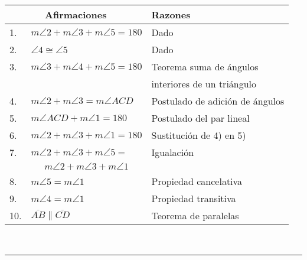 \documentclass[11pt,spanish,letter]{book}
\newenvironment{sol}[2]{\renewcommand{\arraystretch}{2.06}
\newcommand{\tn}{\tabularnewline}
\newcommand{\rr}{\raggedright}
\fontsize{7}{6}\selectfont
\vskip 5pt  {
 \colorbox{red!30}{\color{white}{Soluci\'on:}}
 }\vskip 5pt
\begin{center}
 \begin{tabular}
[t]{ll||l}\hline
\multicolumn{2}{c||}{Afirmaciones} & Razones\\\hline\hline
1. & #1 & \multicolumn{1}{|l}{Dado}\\
#2
\end{tabular}\end{center}
\ \ \  \vskip 5pt}{\hfill  \raggedright{ \rule{0.5em}{0.5em} }\vskip 5pt }
\begin{document}
\begin{sol}{$m\angle2+m\angle3+m\angle5=180$}{
2. & $\angle4\cong\angle5$ & Dado\\
3. & $m\angle3+m\angle4+m\angle5=180$ & Teorema suma de \'angulos\\
&  & interiores de un tri\'angulo\\
4. & $m\angle2+m\angle3=m\angle ACD$ & Postulado de adici\'on de \'angulos\\
5. & $m\angle ACD+m\angle1=180$ & Postulado del par lineal\\
6. & $m\angle2+m\angle3+m\angle1=180$ & Sustituci\'on de 4) en 5)\\
7. & $m\angle2+m\angle3+m\angle5=$ & Igualaci\'on\\
& \multicolumn{1}{c|}{$m\angle2+m\angle3+m\angle1$} & \\
8. & $m\angle5=m\angle1$ & Propiedad cancelativa\\
9. & $m\angle4=m\angle1$ & Propiedad transitiva\\
10. & $\overline{AB}\parallel\overline{CD}$ & Teorema de paralelas
}
\end{sol}
\end{document}
